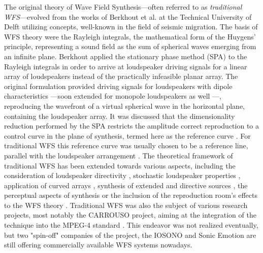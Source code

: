 The original theory of Wave Field Synthesis---often referred to as \emph{traditional WFS}---evolved from the works of Berkhout et al. at the Technical University of Delft utilizing concepts, well-known in the field of seismic migration.%
The basis of WFS theory were the Rayleigh integrals, the mathematical form of the Huygens' principle, representing a sound field as the sum of spherical waves emerging from an infinite plane.
Berkhout applied the stationary phase method (SPA) to the Rayleigh integrals in order to arrive at loudspeaker driving signals for a linear array of loudspeakers instead of the practically infeasible planar array.
The original formulation provided driving signals for loudspeakers with dipole characteristics \cite{Berkhout1988, Berkhout1993:Acoustic_control_by_WFS}---soon extended for monopole loudspeakers as well \cite{doi:10.1121/1.404755, Vogel1993:phd, devries1994the, Start1997:phd, Verheijen1997:phd, deBrujin2004}---, reproducing the wavefront of a virtual spherical wave in the horizontal plane, containing the loudspeaker array.
It was discussed that the dimensionality reduction performed by the SPA restricts the amplitude correct reproduction to a control curve in the plane of synthesis, termed here as the reference curve \cite{sonke1998variable}.
For traditional WFS this reference curve was usually chosen to be a reference line, parallel with the loudspeaker arrangement .
The theoretical framework of traditional WFS has been extended towards various aspects, including the consideration of loudspeaker directivity \cite{devries1996sound, Firtha2012:isma}, stochastic loudspeaker properties \cite{Firtha2013:daga, Firtha2013:internoise}, application of curved arrays \cite{start1996application}, synthesis of extended and directive sources \cite{Corteel2007, Baalman2008:phd}, the perceptual aspects of synthesis \cite{Wittek2007:phd, Corteel2006:phd, Hulsebos2004:phd, wittek2004spatial, strauss2004generation} or the inclusion of the reproduction room's effects to the WFS theory \cite{spors2003an, corteel2003listening, 1326755, buchner2004efficient, petrausch2005simulation}.
Traditional WFS was also the subject of various research projects, most notably the CARROUSO project, aiming at the integration of the technique into the MPEG-4 standard \cite{sporer2001carrouso}. 
This endeavor was not realized eventually, but two "spin-off" companies of the project, the IOSONO and Sonic Emotion are still offering commercially available WFS systems nowadays.

